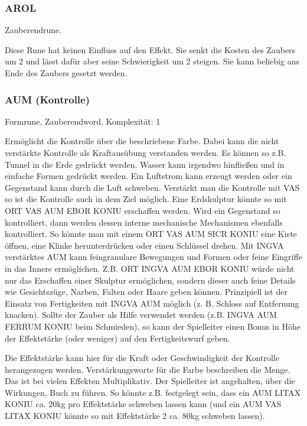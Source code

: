 \documentclass{article}
\begin{document}
\subsubsection{AROL}

Zauberendrune.

Diese Rune hat keinen Einfluss auf den Effekt. Sie senkt die Kosten des Zaubers um 2 und lässt dafür aber seine
Schwierigkeit um 2 steigen. Sie kann beliebig ans Ende des Zaubers gesetzt werden.

\subsubsection{AUM (Kontrolle)}

Formrune, Zauberendword, Komplexität: 1

Ermöglicht die Kontrolle über die beschriebene Farbe. Dabei kann die nicht verstärkte Kontrolle als Kraftausübung
verstanden werden. Es können so z.B. Tunnel in die Erde gedrückt werden. Wasser kann irgendwo hinfließen und in
einfache Formen gedrückt werden. Ein Luftstrom kann erzeugt werden oder ein Gegenstand kann durch die Luft schweben.
Verstärkt man die Kontrolle mit VAS so ist die Kontrolle auch in dem Ziel möglich. Eine Erdskulptur könnte so mit
ORT VAS AUM EBOR KONIU erschaffen werden. Wird ein Gegenstand so kontrolliert, dann werden dessen interne mechanische
Mechanismen ebenfalls kontrolliert. So könnte man mit einem ORT VAS AUM SICR KONIU eine Kiste öffnen, eine Klinke
herunterdrücken oder einen Schlüssel drehen. Mit INGVA verstärktes AUM kann feingranulare Bewegungen und Formen oder
feine Eingriffe in das Innere ermöglichen. Z.B. ORT INGVA AUM EBOR KONIU würde nicht nur das Erschaffen einer Skulptur
ermöglichen, sondern dieser auch feine Details wie Gesichtszüge, Narben, Falten oder Haare geben können. Prinzipiell
ist der Einsatz von Fertigkeiten mit INGVA AUM möglich (z. B. Schloss auf Entfernung knacken). Sollte der Zauber als
Hilfe verwendet werden (z.B. INGVA AUM FERRUM KONIU beim Schmieden), so kann der Spielleiter einen Bonus in Höhe der
Effektstärke (oder weniger) auf den Fertigkeitswurf geben.

Die Effektstärke kann hier für die Kraft oder Geschwindigkeit der Kontrolle herangezogen werden. Verstärkungsworte für
die Farbe beschreiben die Menge. Das ist bei vielen Effekten Multiplikativ. Der Spielleiter ist angehalten, über die
Wirkungen, Buch zu führen. So könnte z.B. festgelegt sein, dass ein AUM LITAX KONIU ca. 20kg pro Effektstärke schweben
lassen kann (und ein AUM VAS LITAX KONIU könnte so mit Effektstärke 2 ca. 80kg schweben lassen).
\end{document}
